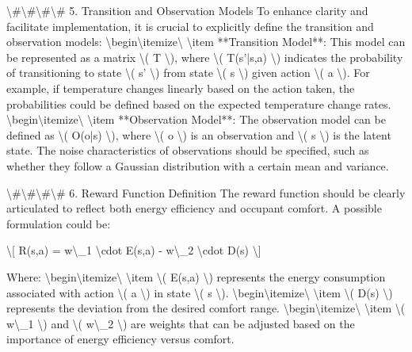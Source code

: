 \documentclass[11pt,a4paper]{article}
\begin{document}
\textbackslash{}#\textbackslash{}#\textbackslash{}#\textbackslash{}# 5. Transition and Observation Models
To enhance clarity and facilitate implementation, it is crucial to explicitly define the transition and observation models:
\textbackslash{}begin\textbackslash{}{itemize\textbackslash{}}
\textbackslash{}item **Transition Model**: This model can be represented as a matrix \textbackslash{}( T \textbackslash{}), where \textbackslash{}( T(s'|s,a) \textbackslash{}) indicates the probability of transitioning to state \textbackslash{}( s' \textbackslash{}) from state \textbackslash{}( s \textbackslash{}) given action \textbackslash{}( a \textbackslash{}). For example, if temperature changes linearly based on the action taken, the probabilities could be defined based on the expected temperature change rates.
\textbackslash{}begin\textbackslash{}{itemize\textbackslash{}}
\textbackslash{}item **Observation Model**: The observation model can be defined as \textbackslash{}( O(o|s) \textbackslash{}), where \textbackslash{}( o \textbackslash{}) is an observation and \textbackslash{}( s \textbackslash{}) is the latent state. The noise characteristics of observations should be specified, such as whether they follow a Gaussian distribution with a certain mean and variance.

\textbackslash{}#\textbackslash{}#\textbackslash{}#\textbackslash{}# 6. Reward Function Definition
The reward function should be clearly articulated to reflect both energy efficiency and occupant comfort. A possible formulation could be:

\textbackslash{}[
R(s,a) = w\textbackslash{}_1 \textbackslash{}cdot E(s,a) - w\textbackslash{}_2 \textbackslash{}cdot D(s)
\textbackslash{}]

Where:
\textbackslash{}begin\textbackslash{}{itemize\textbackslash{}}
\textbackslash{}item \textbackslash{}( E(s,a) \textbackslash{}) represents the energy consumption associated with action \textbackslash{}( a \textbackslash{}) in state \textbackslash{}( s \textbackslash{}).
\textbackslash{}begin\textbackslash{}{itemize\textbackslash{}}
\textbackslash{}item \textbackslash{}( D(s) \textbackslash{}) represents the deviation from the desired comfort range.
\textbackslash{}begin\textbackslash{}{itemize\textbackslash{}}
\textbackslash{}item \textbackslash{}( w\textbackslash{}_1 \textbackslash{}) and \textbackslash{}( w\textbackslash{}_2 \textbackslash{}) are weights that can be adjusted based on the importance of energy efficiency versus comfort.
\end{document}
